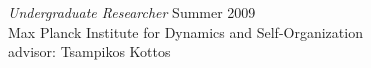 \documentclass{article} %
\begin{document}
\vspace{0.1cm}
\indent
{\em Undergraduate Researcher} \hspace*{\fill} Summer 2009 \\
\indent
Max Planck Institute for Dynamics and Self-Organization \\
\indent advisor: Tsampikos Kottos 
\end{document}
